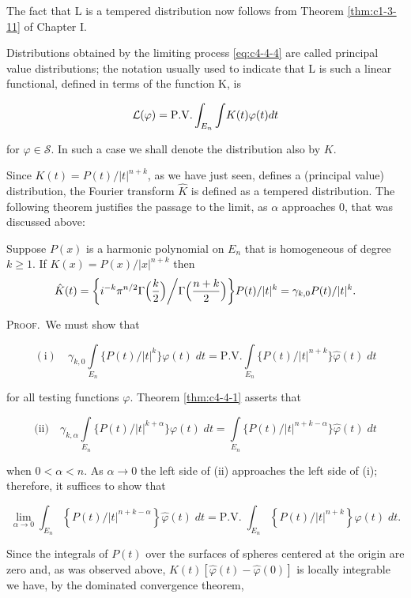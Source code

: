 The fact that L is a tempered distribution now follows from Theorem \ref{thm:c1-3-11} of Chapter I.

Distributions obtained by the limiting process \eqref{eq:c4-4-4} are called principal value distributions; the notation usually used to indicate that L is such a linear functional, defined in terms of the function K, is

\[
{\cal L}(\varphi)=\mathrm{P.V.}\int_{E_{n}}{\int}K(t)\varphi(t)d t
\]

for $\varphi \in \mathcal{S}$. In such a case we shall denote the distribution also by $K$.

Since $K(t) = P(t)/|t|^{n+k}$, as we have just seen, defines a (principal value) distribution, the Fourier transform $\hat{K}$ is defined as a tempered distribution. The following theorem justifies the passage to the limit, as $\alpha$ approaches 0, that was discussed above:

\begin{theorem}
\label{thm:c4-4-5}
Suppose $P(x)$ is a harmonic polynomial on $E_n$ that is homogeneous of degree $k \geq 1$. If $K(x) = P(x)/|x|^{n+k}$ then
\[
\hat{K}(t)=\biggl\lbrace i^{-k}\pi^{n/2}\Gamma\Bigl(\frac{k}{2}\Bigr)\biggl/{\Gamma\Bigl(\frac{n+k}{2}\Bigr)}\biggr\rbrace P(t)/|t|^{k}=\gamma_{k,0}P(t)/|t|^{k}.
\]

\end{theorem}

\textsc{Proof.}\ We must show that

\[
\mathrm{(i)}\quad\gamma_{k,0}\int\limits_{E_{n}}\{P(t)/|t|^{k}\}\varphi(t)\;d t=\mathrm{P.V.}\int\limits_{E_{n}}\{P(t)/|t|^{n+k}\}\hat{\varphi}(t)\;d t
\]

for all testing functions $\varphi$. Theorem \ref{thm:c4-4-1} asserts that

\[
\text{(ii)}\quad\gamma_{k,\alpha}\int\limits_{E_{n}}\{P(t)/|t|^{k+\alpha}\}\varphi(t)\;d t=\int\limits_{E_{n}}\{P(t)/|t|^{n+k-\alpha}\}\hat{\varphi}(t)\;d t
\]

when $0 < \alpha < n$. As $\alpha \to 0$ the left side of (ii) approaches the left side of (i); therefore, it suffices to show that

\[
\lim_{\alpha\to0}\int_{E_{n}}\left\{P(t)/|t|^{n+k-\alpha}\right\}\hat{\varphi}(t)\;d t=\mathrm{P.V.}\;\int_{E_{n}}\left\{P(t)/|t|^{n+k}\right\}\hat{\varphi}(t)\;d t.
\]

Since the integrals of $P(t)$ over the surfaces of spheres centered at the origin are zero and, as was observed above, $K(t)[\hat{\varphi}(t) - \hat{\varphi}(0)]$ is locally integrable we have, by the dominated convergence theorem,

